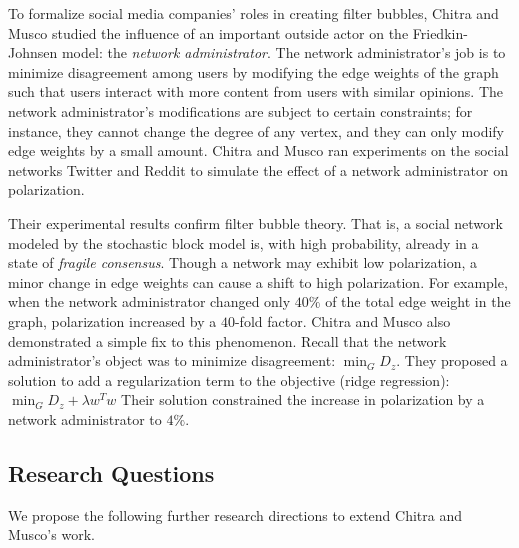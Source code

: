 To formalize social media companies’ roles in creating filter bubbles,
Chitra and Musco studied the influence of an important outside actor on 
the Friedkin-Johnsen model: the \emph{network administrator}. The network
administrator’s job is to minimize disagreement among users by 
modifying the edge weights of the graph such that users interact
with more content from users with similar opinions. The network
administrator’s modifications are subject to certain constraints;
for instance, they cannot change the degree of any vertex, 
and they can only modify edge weights by a small amount. 
Chitra and Musco ran experiments on the social networks Twitter
and Reddit to simulate the effect of a network administrator
on polarization.

Their experimental results confirm filter bubble theory. 
That is, a social network modeled by the stochastic block 
model is, with high probability, already in a state of \emph{fragile consensus}. 
Though a network may exhibit low polarization, a minor change in 
edge weights can cause a shift to high polarization. 
For example, when the network administrator changed only 
$40\%$ of the total edge weight in the graph, polarization 
increased by a $40$-fold factor. Chitra and Musco also demonstrated 
a simple fix to this phenomenon. Recall that the network 
administrator’s object was to minimize disagreement:
$\min_G D_z$.
They proposed a solution to add a regularization term to the objective
(ridge regression): 
$\min_G D_z + \lambda w^Tw$
Their solution constrained the increase in polarization by a network
administrator to $4\%$. 

\subsection*{Research Questions}

We propose the following further research directions to
extend Chitra and Musco’s work. 

